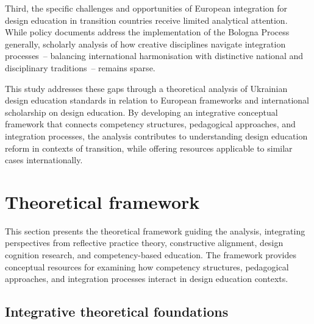 \documentclass[ed]{acnsart}
\begin{document}
	Third, the specific challenges and opportunities of European integration for design education in transition countries receive limited analytical attention. While policy documents address the implementation of the Bologna Process generally, scholarly analysis of how creative disciplines navigate integration processes~-- balancing international harmonisation with distinctive national and disciplinary traditions~-- remains sparse.
	
	This study addresses these gaps through a theoretical analysis of Ukrainian design education standards in relation to European frameworks and international scholarship on design education. By developing an integrative conceptual framework that connects competency structures, pedagogical approaches, and integration processes, the analysis contributes to understanding design education reform in contexts of transition, while offering resources applicable to similar cases internationally.
	
	
	
	\section{Theoretical framework}
	\label{sec:framework}
	
	This section presents the theoretical framework guiding the analysis, integrating perspectives from reflective practice theory, constructive alignment, design cognition research, and competency-based education. The framework provides conceptual resources for examining how competency structures, pedagogical approaches, and integration processes interact in design education contexts.
	
	\subsection{Integrative theoretical foundations}
	
\end{document}
